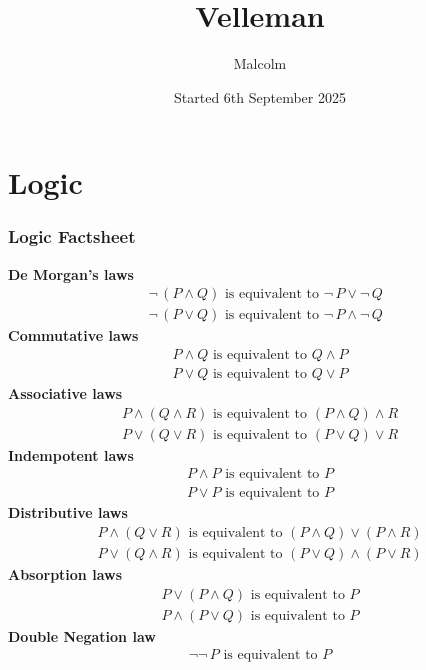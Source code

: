 \documentclass{report}
\title{Velleman}
\date{Started 6th September 2025}
\author{Malcolm}
\begin{document}
\maketitle

\tableofcontents

\newpage
\chapter{Logic}
\subsection{Logic Factsheet}
\textbf{De Morgan's laws}
\begin{align*}
&\neg\,(P\land Q)\text{ is equivalent to }\neg\,P\lor\neg\,Q\\
&\neg\,(P\lor Q)\text{ is equivalent to }\neg\,P\land\neg\,Q
\end{align*}
\textbf{Commutative laws}
\begin{align*}
P\land Q\text{ is equivalent to }Q\land P\\
P\lor Q\text{ is equivalent to }Q\lor P
\end{align*}
\textbf{Associative laws}
\begin{align*}
P\land(Q\land R)\text{ is equivalent to }(P\land Q)\land R\\
P\lor(Q\lor R)\text{ is equivalent to }(P\lor Q)\lor R
\end{align*}
\textbf{Indempotent laws}
\begin{align*}
P\land P\text{ is equivalent to }P\\
P\lor P\text{ is equivalent to }P
\end{align*}
\textbf{Distributive laws}
\begin{align*}
P\land(Q\lor R)\text{ is equivalent to }(P\land Q)\lor(P\land R)\\
P\lor(Q\land R)\text{ is equivalent to }(P\lor Q)\land(P\lor R)
\end{align*}
\textbf{Absorption laws}
\begin{align*}
P\lor(P\land Q)\text{ is equivalent to }P\\
P\land(P\lor Q)\text{ is equivalent to }P
\end{align*}
\textbf{Double Negation law}
\begin{align*}
\neg\neg\,P\text{ is equivalent to }P
\end{align*}
\newpage
\end{document}
